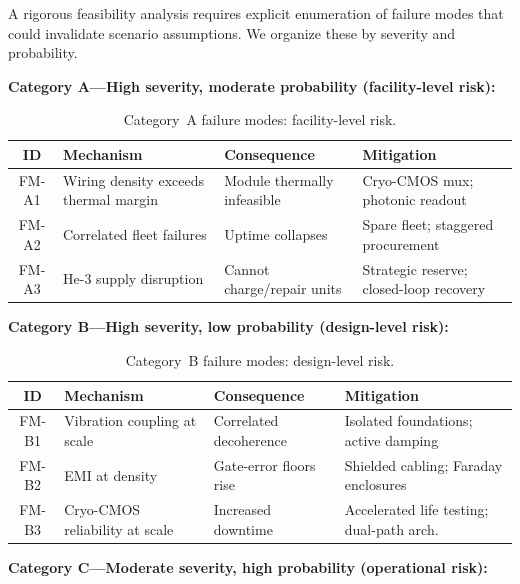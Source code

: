 \documentclass[conference]{IEEEtran}
\begin{document}
A rigorous feasibility analysis requires explicit enumeration of failure modes that could invalidate scenario assumptions. We organize these by severity and probability.

\textbf{Category A---High severity, moderate probability (facility-level risk):}

\begin{table}[H]
\centering
\caption{Category~A failure modes: facility-level risk.}
\label{tab:fm-a}
\footnotesize
\begin{tabularx}{\columnwidth}{cL{2.0cm}L{1.8cm}L{2.0cm}}
\toprule
\textbf{ID} & \textbf{Mechanism} & \textbf{Consequence} & \textbf{Mitigation} \\
\midrule
FM-A1 & Wiring density exceeds thermal margin & Module thermally infeasible & Cryo-CMOS mux; photonic readout \\
FM-A2 & Correlated fleet failures & Uptime collapses & Spare fleet; staggered procurement \\
FM-A3 & He-3 supply disruption & Cannot charge/repair units & Strategic reserve; closed-loop recovery \\
\bottomrule
\end{tabularx}
\end{table}

\textbf{Category B---High severity, low probability (design-level risk):}

\begin{table}[H]
\centering
\caption{Category~B failure modes: design-level risk.}
\label{tab:fm-b}
\footnotesize
\begin{tabularx}{\columnwidth}{cL{2.0cm}L{1.8cm}L{2.0cm}}
\toprule
\textbf{ID} & \textbf{Mechanism} & \textbf{Consequence} & \textbf{Mitigation} \\
\midrule
FM-B1 & Vibration coupling at scale & Correlated decoherence & Isolated foundations; active damping \\
FM-B2 & EMI at density & Gate-error floors rise & Shielded cabling; Faraday enclosures \\
FM-B3 & Cryo-CMOS reliability at scale & Increased downtime & Accelerated life testing; dual-path arch. \\
\bottomrule
\end{tabularx}
\end{table}

\textbf{Category C---Moderate severity, high probability (operational risk):}
\end{document}
